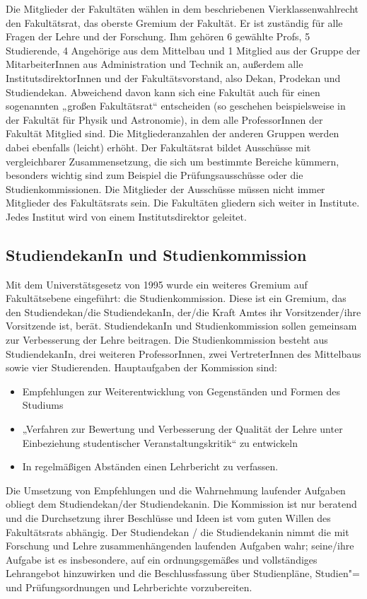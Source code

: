 Die Mitglieder der Fakultäten wählen in dem beschriebenen
Vierklassenwahlrecht den Fakultätsrat, das oberste Gremium der Fakultät.
Er ist zuständig für alle Fragen der Lehre und der Forschung. Ihm gehören
6 gewählte Profs, 5 Studierende, 4 Angehörige aus dem Mittelbau und 1 Mitglied
aus der Gruppe der MitarbeiterInnen aus Administration und Technik
an, außerdem alle InstitutsdirektorInnen und der Fakultätsvorstand, also Dekan,
Prodekan und Studiendekan. Abweichend davon kann sich eine Fakultät auch für einen
sogenannten „großen Fakultätsrat“ entscheiden (so geschehen beispielsweise in der 
Fakultät für Physik und Astronomie), in dem alle ProfessorInnen der Fakultät 
Mitglied sind. Die Mitgliederanzahlen der anderen Gruppen werden dabei ebenfalls
(leicht) erhöht. Der Fakultätsrat bildet Ausschüsse mit vergleichbarer
Zusammensetzung, die sich um bestimmte Bereiche kümmern, besonders wichtig
sind zum Beispiel die Prüfungsausschüsse oder die Studienkommissionen. Die
Mitglieder der Ausschüsse müssen nicht immer Mitglieder des Fakultätsrats
sein. Die Fakultäten gliedern sich weiter in Institute. Jedes Institut
wird von einem Institutsdirektor geleitet.

\subsection{StudiendekanIn und Studienkommission}

Mit dem Universtätsgesetz von 1995 wurde ein weiteres Gremium auf Fakultätsebene 
eingeführt: die Studienkommission. Diese ist ein Gremium, das den Studiendekan/die
StudiendekanIn, der/die Kraft Amtes ihr Vorsitzender/ihre Vorsitzende ist, berät.
StudiendekanIn und Studienkommission sollen gemeinsam zur Verbesserung der Lehre
beitragen. Die Studienkommission besteht aus StudiendekanIn, drei weiteren
ProfessorInnen, zwei VertreterInnen des Mittelbaus sowie vier Studierenden.
Hauptaufgaben der Kommission sind:
\begin{itemize}
    \addtolength{\itemsep}{-0.7\baselineskip}
    \item Empfehlungen zur Weiterentwicklung von Gegenständen und Formen des Studiums
    \item „Verfahren zur Bewertung und Verbesserung  der Qualität der Lehre unter
          Einbeziehung studentischer Veranstaltungskritik“ zu entwickeln
    \item In regelmäßigen Abständen einen Lehrbericht zu verfassen.
\end{itemize}

Die Umsetzung von Empfehlungen und die Wahrnehmung laufender Aufgaben
obliegt dem Studiendekan/der Studiendekanin. Die Kommission ist nur
beratend und die Durchsetzung ihrer Beschlüsse und Ideen ist vom guten
Willen des Fakultätsrats abhängig. Der Studiendekan / die Studiendekanin
nimmt die mit Forschung und Lehre zusammenhängenden laufenden Aufgaben
wahr; seine/ihre Aufgabe ist es insbesondere, auf ein ordnungsgemäßes und
vollständiges Lehrangebot hinzuwirken und die Beschlussfassung über
Studienpläne, Studien"= und Prüfungsordnungen und Lehrberichte
vorzubereiten.


